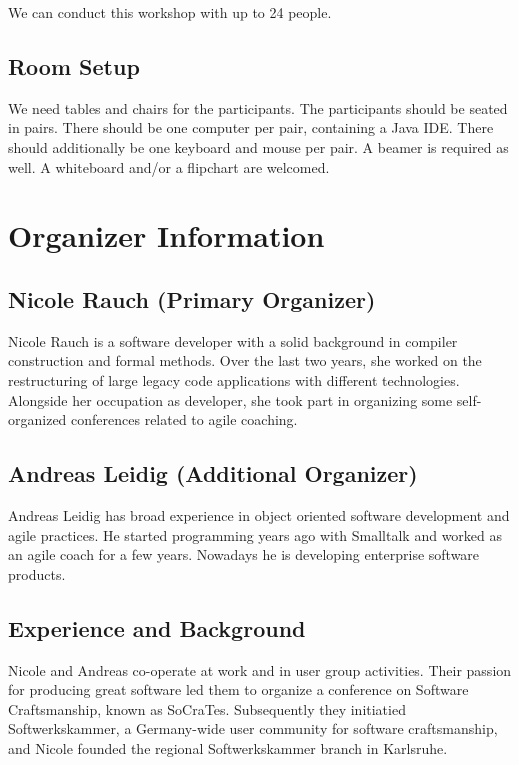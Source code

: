 \documentclass[a4,11pt]{article}
\begin{document}
We can conduct this workshop with up to 24 people.

\subsection*{Room Setup}

We need tables and chairs for the participants. The participants should be seated in pairs. There should be one computer per pair, containing a Java IDE. There should additionally be one keyboard and mouse per pair.
A beamer is required as well. A whiteboard and/or a flipchart are welcomed.

\section*{Organizer Information}

\subsection*{Nicole Rauch (Primary Organizer)}

Nicole Rauch is a software developer with a solid background in compiler construction and formal methods. Over the last two years, she 
worked on the restructuring of large legacy code applications with different technologies. Alongside her occupation as developer, she took part in organizing some self-organized conferences related to agile coaching. 


\subsection*{Andreas Leidig (Additional Organizer)}
Andreas Leidig has broad experience in object oriented software development and agile practices. He started programming years ago with Smalltalk and worked as an agile coach for a few years. Nowadays he is developing enterprise software products. 

\subsection*{Experience and Background}
Nicole and Andreas co-operate at work and in user group activities. 
Their passion for producing great software led them to organize a conference on Software Craftsmanship, known as SoCraTes. Subsequently they initiatied Softwerkskammer, a Germany-wide user community for software craftsmanship, and Nicole founded the regional Softwerkskammer branch in Karlsruhe.
\end{document}
